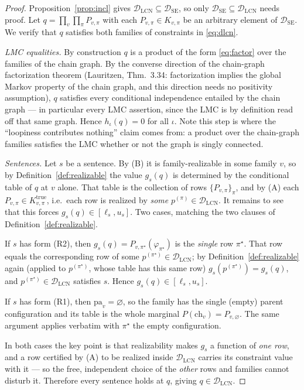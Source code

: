 \documentclass[11pt]{article}
\theoremstyle{definition}
\newcommand{\DSE}{\mathcal{D}_{\mathrm{SE}}}
\newcommand{\DLCN}{\mathcal{D}_{\mathrm{LCN}}}
\newcommand{\ch}{\mathrm{ch}}
\newcommand{\pa}{\mathrm{pa}}
\begin{document}
\begin{proof}
Proposition~\ref{prop:incl} gives $\DLCN\subseteq\DSE$, so only $\DSE\subseteq\DLCN$ needs proof.
Let $q=\prod_v\prod_\pi P_{v,\pi}$ with each $P_{v,\pi}\in K_{v,\pi}$ be an arbitrary element of
$\DSE$. We verify that $q$ satisfies both families of constraints in \eqref{eq:dlcn}.

\emph{LMC equalities.} By construction $q$ is a product of the form \eqref{eq:factor} over the
families of the chain graph. By the converse direction of the chain-graph factorization theorem
(Lauritzen, Thm.~3.34: factorization implies the global Markov property of the chain graph, and this
direction needs no positivity assumption), $q$ satisfies every conditional independence entailed by
the chain graph --- in particular every LMC assertion, since the LMC is by definition read off that
same graph. Hence $h_\iota(q)=0$ for all $\iota$. Note this step is where the ``loopiness contributes
nothing'' claim comes from: a product over the chain-graph families satisfies the LMC whether or not
the graph is singly connected.

\emph{Sentences.} Let $s$ be a sentence. By (B) it is family-realizable in some family $v$, so by
Definition~\ref{def:realizable} the value $g_s(q)$ is determined by the conditional table of $q$ at
$v$ alone. That table is the collection of rows $\{P_{v,\pi}\}_\pi$, and by (A) each
$P_{v,\pi}\in K_{v,\pi}^{\mathrm{true}}$, i.e.\ each row is realized by \emph{some} $p^{(\pi)}\in
\DLCN$. It remains to see that this forces $g_s(q)\in[\ell_s,u_s]$. Two cases, matching the two
clauses of Definition~\ref{def:realizable}.

If $s$ has form (R2), then $g_s(q)=P_{v,\pi^\star}(\varphi_{\pi^\star})$ is the \emph{single} row
$\pi^\star$. That row equals the corresponding row of some $p^{(\pi^\star)}\in\DLCN$; by
Definition~\ref{def:realizable} again (applied to $p^{(\pi^\star)}$, whose table has this same row)
$g_s(p^{(\pi^\star)})=g_s(q)$, and $p^{(\pi^\star)}\in\DLCN$ satisfies $s$. Hence
$g_s(q)\in[\ell_s,u_s]$.

If $s$ has form (R1), then $\pa_v=\varnothing$, so the family has the single (empty) parent
configuration and its table is the whole marginal $P(\ch_v)=P_{v,\varnothing}$. The same argument
applies verbatim with $\pi^\star$ the empty configuration.

In both cases the key point is that realizability makes $g_s$ a function of \emph{one row}, and a
row certified by (A) to be realized inside $\DLCN$ carries its constraint value with it --- so the
free, independent choice of the \emph{other} rows and families cannot disturb it. Therefore every
sentence holds at $q$, giving $q\in\DLCN$.
\end{proof}
\end{document}

